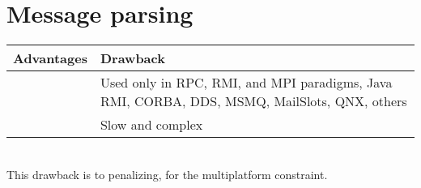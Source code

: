 \section{Message parsing}

\begin{tabular}{|p{}||p{}|}
\hline
  \textbf{Advantages}&\textbf{Drawback}\\
\hline
&Used only in RPC, RMI, and MPI paradigms, Java RMI, CORBA, DDS, MSMQ, MailSlots, QNX, others\\
  \hline
  &Slow and complex\\
\end{tabular}
~\\

This drawback is to penalizing, for the multiplatform constraint.








